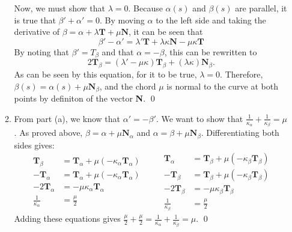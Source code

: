 \documentclass{article}
\begin{document}
\begin{enumerate}
\begin{enumerate}
Now, we must show that $\lambda = 0$.
Because $\alpha(s)$ and $\beta(s)$ are parallel, it is true that $\beta' + \alpha' = 0$. 
By moving $\alpha$ to the left side and taking the derivative of $\beta = \alpha + \lambda\mathbf{T} + \mu\mathbf{N}$, it can be seen that 
\begin{equation*}
\beta' - \alpha' = \lambda'\mathbf{T} + \lambda\kappa\mathbf{N} - \mu\kappa\mathbf{T}
\end{equation*}
By noting that $\beta' = T_{\beta}$ and that $\alpha = -\beta$, this can be rewritten to
\begin{equation*}
2\mathbf{T}_{\beta} = (\lambda' - \mu\kappa)\mathbf{T}_{\beta} + (\lambda\kappa)\mathbf{N}_{\beta}.
\end{equation*}
As can be seen by this equation, for it to be true, $\lambda = 0$. 
Therefore, $\beta(s) = \alpha(s) + \mu\mathbf{N}_{\beta}$, and the chord $\mu$ is normal to the curve at both points by definiton of the vector \textbf{N}.
\qed

\item From part (a), we know that $\alpha' = -\beta'$.
We want to show that $\frac{1}{\kappa_{\alpha}} + \frac{1}{\kappa_{\beta}} = \mu$.
As proved above, $\beta = \alpha +\mu\mathbf{N}_{\alpha}$ and $\alpha = \beta + \mu\mathbf{N}_{\beta}$.
Differentiating both sides gives:
\begin{equation*}
\begin{split}
\mathbf{T}_{\beta} &= \mathbf{T}_{\alpha} + \mu(-\kappa_{\alpha}\mathbf{T}_{\alpha})\\
-\mathbf{T}_{\alpha} &= \mathbf{T}_{\alpha} + \mu(-\kappa_{\alpha}\mathbf{T}_{\alpha})\\
-2\mathbf{T}_{\alpha} &= -\mu\kappa_{\alpha}\mathbf{T}_{\alpha}\\
\frac{1}{\kappa_{\alpha}} &= \frac{\mu}{2}
\end{split}
\qquad
\begin{split}
\mathbf{T}_{\alpha} &= \mathbf{T}_{\beta} + \mu(-\kappa_{\beta}\mathbf{T}_{\beta})\\
-\mathbf{T}_{\beta} &= \mathbf{T}_{\beta} + \mu(-\kappa_{\beta}\mathbf{T}_{\beta})\\
-2\mathbf{T}_{\beta} &= -\mu\kappa_{\beta}\mathbf{T}_{\beta}\\
\frac{1}{\kappa_{\beta}} &= \frac{\mu}{2}
\end{split}
\end{equation*}
Adding these equations gives $\frac{\mu}{2}+\frac{\mu}{2} = \frac{1}{\kappa_{\alpha}} + \frac{1}{\kappa_{\beta}} = \mu$.
\qed


\end{enumerate}
\end{enumerate}
\end{document}
